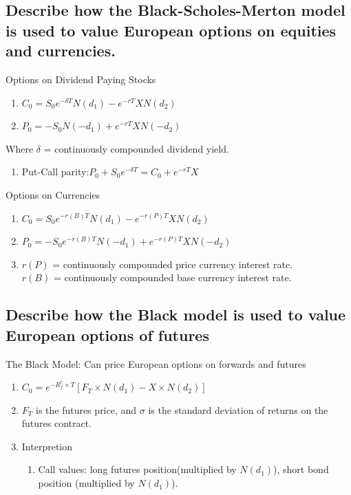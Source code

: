 \documentclass{article}
\newcommand{\be}{\begin{enumerate}}
\newcommand{\ee}{\end{enumerate}}
\begin{document}
\subsection{Describe how the Black-Scholes-Merton model is used to value European
options on equities and currencies.}
Options on Dividend Paying Stocks
\be
    \item $C_0=S_0e^{-\delta T}N(d_1)-e^{-rT}XN(d_2)$ 
    \item $P_0=-S_0N(-d_1)+e^{-rT}XN(-d_2)$  
\ee
Where $\delta$ = continuously compounded dividend yield.
\be
    \item Put-Call parity:$P_0+S_0e^{-\delta T}=C_0+e^{-rT}X$
\ee
Options on Currencies
\be
    \item $C_0=S_0e^{-r(B)T}N(d_1)-e^{-r(P)T}XN(d_2)$
    \item $P_0=-S_0e^{-r(B)T}N(-d_1)+e^{-r(P)T}XN(-d_2)$  
    \item $r(P)$ = continuously compounded price currency interest rate.
        \\$r(B)$ = continuously compounded base currency interest rate. 
\ee
\subsection{Describe how the Black model is used to value European options of futures}
The Black Model: Can price European options on forwards and futures
\be
    \item $C_0=e^{-R_f^c\times T}[F_T\times N(d_1)-X\times N(d_2)]$
    \item $F_T$ is the futures price, and $\sigma$ is the standard deviation of 
    returns on the futures contract.
    \item Interpretion
    \be
        \item Call values: long futures position(multiplied by $N(d_1)$), short bond position
        (multiplied by $N(d_1)$).
    \ee
\ee
\end{document}
